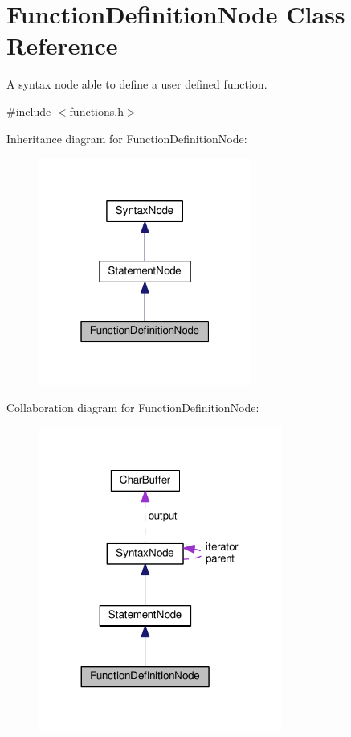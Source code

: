 \hypertarget{classFunctionDefinitionNode}{}\section{Function\+Definition\+Node Class Reference}
\label{classFunctionDefinitionNode}


A syntax node able to define a user defined function.  




{\ttfamily \#include $<$functions.\+h$>$}



Inheritance diagram for Function\+Definition\+Node\+:\nopagebreak
\begin{figure}[H]
\begin{center}
\leavevmode
\includegraphics[width=199pt]{classFunctionDefinitionNode__inherit__graph}
\end{center}
\end{figure}


Collaboration diagram for Function\+Definition\+Node\+:\nopagebreak
\begin{figure}[H]
\begin{center}
\leavevmode
\includegraphics[width=227pt]{classFunctionDefinitionNode__coll__graph}
\end{center}
\end{figure}
